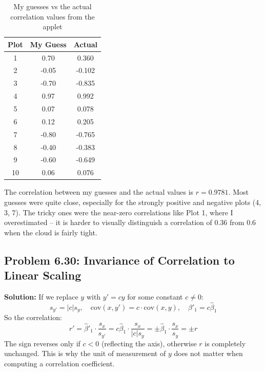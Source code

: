 \documentclass[11pt, a4paper]{article}
\begin{document}
\begin{table}[H]
\centering
\begin{tabular}{c c c}
\toprule
\textbf{Plot} & \textbf{My Guess} & \textbf{Actual} \\
\midrule
1  &  0.70  &  0.360  \\
2  & -0.05  & -0.102  \\
3  & -0.70  & -0.835  \\
4  &  0.97  &  0.992  \\
5  &  0.07  &  0.078  \\
6  &  0.12  &  0.205  \\
7  & -0.80  & -0.765  \\
8  & -0.40  & -0.383  \\
9  & -0.60  & -0.649  \\
10 &  0.06  &  0.076  \\
\bottomrule
\end{tabular}
\caption{My guesses vs the actual correlation values from the applet}
\end{table}

The correlation between my guesses and the actual values is $r = 0.9781$. Most guesses were quite close, especially for the strongly positive and negative plots (4, 3, 7). The tricky ones were the near-zero correlations like Plot 1, where I overestimated -- it is harder to visually distinguish a correlation of 0.36 from 0.6 when the cloud is fairly tight.

\subsection{Problem 6.30: Invariance of Correlation to Linear Scaling}
\textbf{Solution:}
If we replace $y$ with $y' = cy$ for some constant $c \ne 0$:
$$s_{y'} = |c| s_y, \quad \text{cov}(x, y') = c \cdot \text{cov}(x, y), \quad \hat{\beta}'_1 = c\hat{\beta}_1$$
So the correlation:
$$r' = \hat{\beta}'_1 \cdot \frac{s_x}{s_{y'}} = c\hat{\beta}_1 \cdot \frac{s_x}{|c|s_y} = \pm \hat{\beta}_1 \cdot \frac{s_x}{s_y} = \pm r$$
The sign reverses only if $c < 0$ (reflecting the axis), otherwise $r$ is completely unchanged. This is why the unit of measurement of $y$ does not matter when computing a correlation coefficient.
\end{document}
